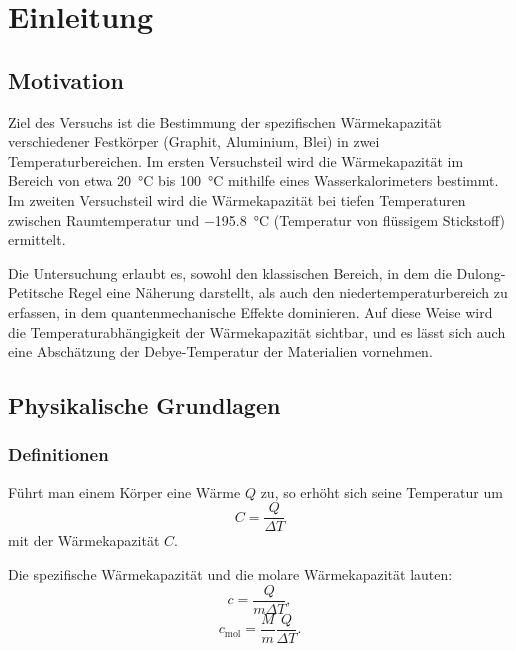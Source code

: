 \chapter{Einleitung}

\section{Motivation}
Ziel des Versuchs ist die Bestimmung der spezifischen Wärmekapazität verschiedener Festkörper (Graphit, Aluminium, Blei) in zwei Temperaturbereichen.  
Im ersten Versuchsteil wird die Wärmekapazität im Bereich von etwa \SI{20}{\celsius} bis \SI{100}{\celsius} mithilfe eines Wasserkalorimeters bestimmt.  
Im zweiten Versuchsteil wird die Wärmekapazität bei tiefen Temperaturen zwischen Raumtemperatur und \SI{-195.8}{\celsius} (Temperatur von flüssigem Stickstoff) ermittelt.  

Die Untersuchung erlaubt es, sowohl den klassischen Bereich, in dem die Dulong-Petitsche Regel eine Näherung darstellt, als auch den nieder­temperatur­bereich zu erfassen, in dem quantenmechanische Effekte dominieren. Auf diese Weise wird die Temperaturabhängigkeit der Wärmekapazität sichtbar, und es lässt sich auch eine Abschätzung der Debye-Temperatur der Materialien vornehmen.

\section{Physikalische Grundlagen}
\cite{skript25}
\subsection*{Definitionen}
Führt man einem Körper eine Wärme \( Q \) zu, so erhöht sich seine Temperatur um
\begin{equation}
    C = \frac{Q}{\Delta T}
    \label{eq:waermekapazitaet}
\end{equation}
mit der Wärmekapazität \( C \).  

Die spezifische Wärmekapazität und die molare Wärmekapazität lauten:
\begin{equation}
    c = \frac{Q}{m \Delta T},
    \label{eq:spezifische_waermekapazitaet}
\end{equation}
\begin{equation}
    c_{\text{mol}} = \frac{M}{m}\frac{Q}{\Delta T}.
    \label{eq:molwaerme}
\end{equation}

